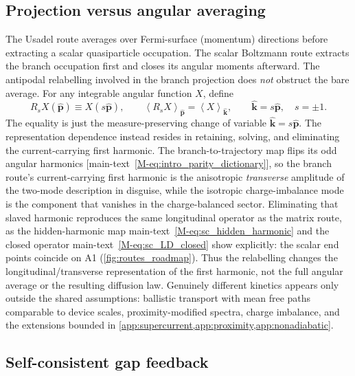 \documentclass[
  aps,
  prb,
  preprint,
  superscriptaddress,
  longbibliography,
  nofootinbib
]{revtex4-2}
\newcommand{\avg}[1]{\left\langle #1 \right\rangle}
\newcommand{\bk}{\mathbf{k}}
\newcommand{\bp}{\mathbf{p}}
\begin{document}
\subsection{Projection versus angular averaging}
\label{sec:projection_vs_averaging}

The Usadel route averages over Fermi-surface (momentum) directions before
extracting a scalar quasiparticle occupation. The scalar Boltzmann route extracts the
branch occupation first and closes its angular moments afterward. The
antipodal relabelling involved in the branch projection does \emph{not}
obstruct the bare average. For any integrable angular function \(X\), define
\begin{equation}
  R_sX(\hat{\bp})\equiv X(s\hat{\bp}),
  \qquad
  \avg{R_sX}_{\hat{\bp}}=\avg{X}_{\hat{\bk}},
  \qquad
  \hat{\bk}=s\hat{\bp},\quad s=\pm1 .
  \label{eq:antipodal_average_identity}
\end{equation}
The equality is just the measure-preserving change of variable
\(\hat{\bk}=s\hat{\bp}\). The representation dependence instead resides
in retaining, solving, and eliminating the current-carrying first harmonic.
The branch-to-trajectory map flips its odd angular harmonics
[main-text~\cref{M-eq:intro_parity_dictionary}], so the branch route's
current-carrying first harmonic is the anisotropic
\emph{transverse} amplitude of the two-mode description in
disguise, while the isotropic charge-imbalance mode is the component
that vanishes in the charge-balanced sector. Eliminating that slaved
harmonic reproduces the same longitudinal operator as the matrix route,
as the hidden-harmonic map main-text~\cref{M-eq:sc_hidden_harmonic} and the
closed operator main-text~\cref{M-eq:sc_LD_closed} show explicitly: the scalar end points coincide on A1
(\cref{fig:routes_roadmap}). Thus the relabelling changes the
longitudinal/transverse representation of the first harmonic, not the full
angular average or the resulting diffusion law. Genuinely different kinetics
appears only outside the shared assumptions: ballistic
transport with mean free paths comparable to device scales,
proximity-modified spectra, charge imbalance, and the extensions bounded
in \cref{app:supercurrent,app:proximity,app:nonadiabatic}.

\subsection{Self-consistent gap feedback}
\label{sec:self_consistent_feedback}
\end{document}
